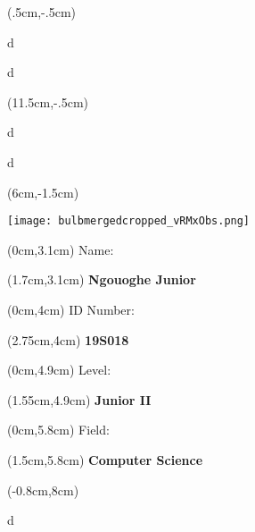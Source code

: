 \documentclass{report}
\begin{document}

	\begin{textblock*}{4cm}(.5cm,-.5cm)
		\centerline{d}
		\centerline{d}
	\end{textblock*}
	
	\begin{textblock*}{4cm}(11.5cm,-.5cm)
		\centerline{d}
		\centerline{d}
	\end{textblock*}
	
	\begin{textblock*}{4cm}(6cm,-1.5cm)
		\centerline{\texttt{[image: bulbmergedcropped\_vRMxObs.png]}}
	\end{textblock*}

	\begin{textblock*}{4cm}(0cm,3.1cm)
	    \Large Name:
	\end{textblock*}

	\begin{textblock*}{12cm}(1.7cm,3.1cm)
	     \Large \bf Ngouoghe Junior
	\end{textblock*}

	\begin{textblock*}{4cm}(0cm,4cm)
	    \Large ID Number:
	\end{textblock*}

	\begin{textblock*}{12cm}(2.75cm,4cm)
	    \Large \bf 19S018
	\end{textblock*}

	\begin{textblock*}{4cm}(0cm,4.9cm)
	    \Large Level:
	\end{textblock*}

	\begin{textblock*}{12cm}(1.55cm,4.9cm)
	    \Large\bf Junior II
	\end{textblock*}

	\begin{textblock*}{4cm}(0cm,5.8cm)
	    \Large Field:
	\end{textblock*}

	\begin{textblock*}{12cm}(1.5cm,5.8cm)
	    \Large \bf Computer Science
	\end{textblock*}

	\begin{textblock*}{18cm}(-0.8cm,8cm)
		\begin{center}
	     		 \color{documentBaseColor} \fontsize{33}{40}\selectfont d
		\end{center}
	\end{textblock*}
\end{document}
